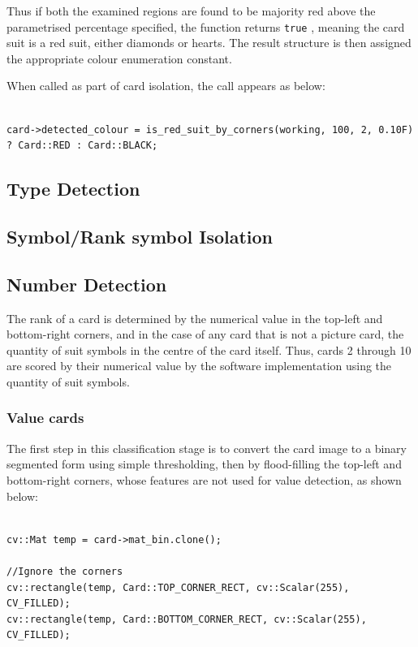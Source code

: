 \documentclass[a4paper,12pt,notitlepage]{article}
\newcommand{\code}[1]{\colorbox{white}{\lstinline[basicstyle=\ttfamily\color{black}]|#1|} }
\begin{document}
		Thus if both the examined regions are found to be majority red above the parametrised percentage specified, the function returns \code{true}, meaning the card suit is a red suit, either diamonds or hearts. The result structure is then assigned the appropriate colour enumeration constant.

		When called as part of card isolation, the call appears as below:

		\begin{lstlisting}

card->detected_colour = is_red_suit_by_corners(working, 100, 2, 0.10F) ? Card::RED : Card::BLACK;
		\end{lstlisting}


	\subsection{Type Detection}
	\subsection{Symbol/Rank symbol Isolation}
	\subsection{Number Detection}
		The rank of a card is determined by the numerical value in the top-left and bottom-right corners, and in the case of any card that is not a picture card, the quantity of suit symbols in the centre of the card itself. Thus, cards 2 through 10 are scored by their numerical value by the software implementation using the quantity of suit symbols.

		\subsubsection{Value cards}
			The first step in this classification stage is to convert the card image to a binary segmented form using simple thresholding, then by flood-filling the top-left and bottom-right corners, whose features are not used for value detection, as shown below:

			\begin{lstlisting}

cv::Mat temp = card->mat_bin.clone();

//Ignore the corners
cv::rectangle(temp, Card::TOP_CORNER_RECT, cv::Scalar(255), CV_FILLED);
cv::rectangle(temp, Card::BOTTOM_CORNER_RECT, cv::Scalar(255), CV_FILLED);
			\end{lstlisting}
\end{document}
